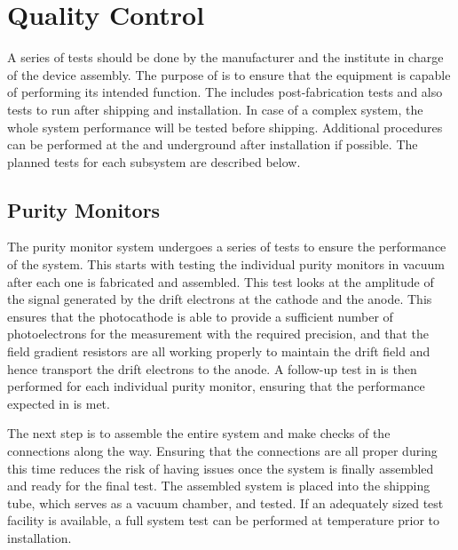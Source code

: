 \section{Quality Control}
\label{sec:fdgen-slow-cryo-qc}
A series of tests should be done by the manufacturer and the institute in charge of the device assembly. The purpose of   is to ensure that the equipment is capable of performing its intended function. The  includes post-fabrication tests and also tests to run after shipping and installation. In case of a complex system, the whole system performance will be tested before shipping. 
Additional  procedures can be performed at the  and underground after installation if possible. The planned tests for each subsystem are described below.  

\subsection{Purity Monitors}
\label{sec:fdgen-slow-cryo-qc-pm}

The purity monitor system undergoes a series of tests to ensure the performance of the system.  This  starts with testing the individual purity monitors in vacuum after each one is fabricated and assembled.  This test looks at the amplitude of the signal generated by the drift electrons at the cathode and the anode.  This ensures that the photocathode is able to provide a sufficient number of photoelectrons for the measurement %
with the required precision, and that the field gradient resistors are all working properly to maintain the drift field and hence transport the drift electrons to the anode.  A follow-up test in \lar is then performed for each individual purity monitor, ensuring that the performance expected in \lar is met.  

The next step %
is to assemble the entire system and make checks of the connections along the way.  Ensuring that the connections are all proper during this time reduces the risk of having issues once the system is finally assembled and ready for the final test.  %
The assembled system is placed into the shipping tube, which serves as a vacuum chamber, and tested. %
If an adequately sized \lar test facility is available, a full system test can be performed at \lar temperature prior to installation. 

